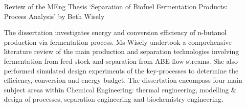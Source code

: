 \documentclass[14pt,twoside]{report}
\begin{document}
\vfill
\clearpage





\bigskip

\begin{center}
  {\Large Review of the MEng Thesis `Separation of Biofuel Fermentation Products: Process Analysis' by Beth Wisely}
\end{center}
The dissertation investigates energy and conversion efficiency of n-butanol production via fermentation process. Ms Wisely undertook a comprehensive literature review of the main production and separation technologies involving fermentation from feed-stock and separation from ABE flow streams. She also performed simulated design experiments of the key-processes to determine the efficiency, conversion and energy budget. The dissertation encompass four main subject areas within Chemical Engineering: thermal engineering, modelling $\&$ design of processes, separation engineering and biochemistry engineering.
\end{document}
